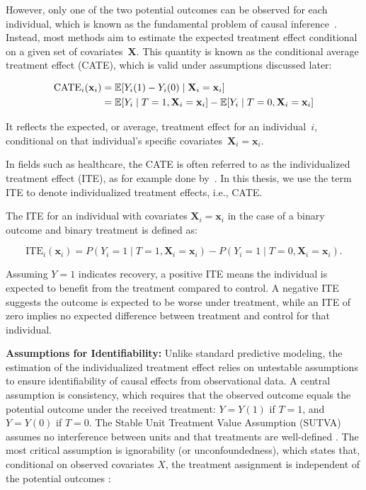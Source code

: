 However, only one of the two potential outcomes can be observed for each individual, which is known as the fundamental problem of causal inference~\citep{holland1986}. Instead, most methods aim to estimate the expected treatment effect conditional on a given set of covariates~$\mathbf{X}$. This quantity is known as the conditional average treatment effect (CATE), which is valid under assumptions discussed later:


\begin{align}
\text{CATE}_i(\mathbf{x}_i) &= \mathbb{E}[Y_i(1) - Y_i(0) \mid \mathbf{X}_i = \mathbf{x}_i] \notag \\
                 &= \mathbb{E}[Y_i \mid T = 1, \mathbf{X}_i = \mathbf{x}_i] - \mathbb{E}[Y_i \mid T = 0, \mathbf{X}_i = \mathbf{x}_i]
\end{align}


It reflects the expected, or average, treatment effect for an individual~$i$, conditional on that individual's specific covariates~$\mathbf{X}_i = \mathbf{x}_i$.

In fields such as healthcare, the CATE is often referred to as the individualized treatment effect (ITE), as for example done by~\citet{hoogland2021}. In this thesis, we use the term ITE to denote individualized treatment effects, i.e., CATE.

The ITE for an individual with covariates $\mathbf{X}_i = \mathbf{x}_i$ in the case of a binary outcome and binary treatment is defined as:

\begin{equation}
\text{ITE}_i(\mathbf{x}_i) = P(Y_i = 1 \mid T = 1, \mathbf{X}_i = \mathbf{x}_i) - P(Y_i = 1 \mid T = 0, \mathbf{X}_i = \mathbf{x}_i).
\end{equation}

Assuming $Y = 1$ indicates recovery, a positive ITE means the individual is expected to benefit from the treatment compared to control. A negative ITE suggests the outcome is expected to be worse under treatment, while an ITE of zero implies no expected difference between treatment and control for that individual.


\textbf{Assumptions for Identifiability:} Unlike standard predictive modeling, the estimation of the individualized treatment effect relies on untestable assumptions to ensure identifiability of causal effects from observational data. A central assumption is consistency, which requires that the observed outcome equals the potential outcome under the received treatment: $Y = Y(1)$ if $T = 1$, and $Y = Y(0)$ if $T = 0$. The Stable Unit Treatment Value Assumption (SUTVA) assumes no interference between units and that treatments are well-defined \citep{rubin1980}. The most critical assumption is ignorability (or unconfoundedness), which states that, conditional on observed covariates $X$, the treatment assignment is independent of the potential outcomes \citep{rosenbaum1983}:

